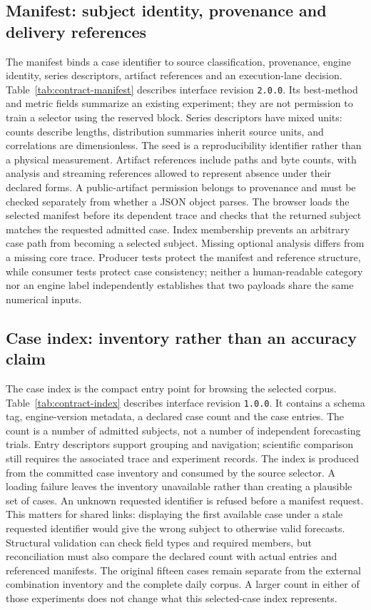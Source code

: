 \subsection{Manifest: subject identity, provenance and delivery references}
\label{sec:contract-manifest}
The manifest binds a case identifier to source classification, provenance, engine identity, series descriptors, artifact references and an execution-lane decision. Table~\ref{tab:contract-manifest} describes interface revision \texttt{2.0.0}. Its best-method and metric fields summarize an existing experiment; they are not permission to train a selector using the reserved block. Series descriptors have mixed units: counts describe lengths, distribution summaries inherit source units, and correlations are dimensionless. The seed is a reproducibility identifier rather than a physical measurement. Artifact references include paths and byte counts, with analysis and streaming references allowed to represent absence under their declared forms. A public-artifact permission belongs to provenance and must be checked separately from whether a JSON object parses. The browser loads the selected manifest before its dependent trace and checks that the returned subject matches the requested admitted case. Index membership prevents an arbitrary case path from becoming a selected subject. Missing optional analysis differs from a missing core trace. Producer tests protect the manifest and reference structure, while consumer tests protect case consistency; neither a human-readable category nor an engine label independently establishes that two payloads share the same numerical inputs.


\subsection{Case index: inventory rather than an accuracy claim}
\label{sec:contract-index}
The case index is the compact entry point for browsing the selected corpus. Table~\ref{tab:contract-index} describes interface revision \texttt{1.0.0}. It contains a schema tag, engine-version metadata, a declared case count and the case entries. The count is a number of admitted subjects, not a number of independent forecasting trials. Entry descriptors support grouping and navigation; scientific comparison still requires the associated trace and experiment records. The index is produced from the committed case inventory and consumed by the source selector. A loading failure leaves the inventory unavailable rather than creating a plausible set of cases. An unknown requested identifier is refused before a manifest request. This matters for shared links: displaying the first available case under a stale requested identifier would give the wrong subject to otherwise valid forecasts. Structural validation can check field types and required members, but reconciliation must also compare the declared count with actual entries and referenced manifests. The original fifteen cases remain separate from the external combination inventory and the complete daily corpus. A larger count in either of those experiments does not change what this selected-case index represents.


